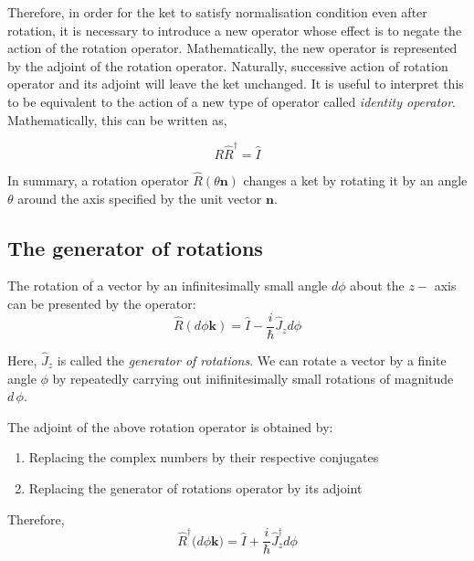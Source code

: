 Therefore, in order for the ket to satisfy normalisation condition even after
rotation, it is necessary to introduce a new operator whose effect is to
negate the action of the rotation operator. Mathematically, the new operator
is represented by the adjoint of the rotation operator. 
Naturally, successive action of
rotation operator and its adjoint will leave the ket unchanged. It is useful
to interpret this to be equivalent to the action of a new type of operator
called \emph{identity operator}. Mathematically, this can be written as,

\begin{equation}
	{R} \hat{R}^{\dagger} =\hat{I}
\end{equation}

In summary, a rotation operator $\hat{R}\left(\theta \mathbf{n}\right)$ changes
a ket by rotating it by an angle $\theta$ around the axis specified by the unit
vector $\mathbf{n}$.

\subsection{The generator of rotations}
The rotation of a vector by an infinitesimally small angle $d\phi$ about the $z-$ axis
can be presented by the operator:
\begin{equation}
\hat{R}(d\phi \mathbf{k}) =\hat{I}-\frac{i}{\hbar} \hat{J}_{z} d \phi
\end{equation}

Here, $\hat{J}_{z}$ is called the \emph{generator of rotations}. We can rotate a 
vector by a finite angle $\phi$ by repeatedly carrying out inifinitesimally
small rotations of magnitude $d\, \phi$. 

The adjoint of the above rotation operator is obtained by: 
\begin{enumerate}
	\item Replacing the complex numbers by their respective conjugates
	\item Replacing the generator of rotations operator by its adjoint
\end{enumerate}

Therefore,
\begin{equation}
\hat {R}^{\dagger}(d \phi \mathbf{ k)}=\hat{I}+\frac{i}{\hbar} \hat{J}_{z}^{\dagger} d \phi
\end{equation}

